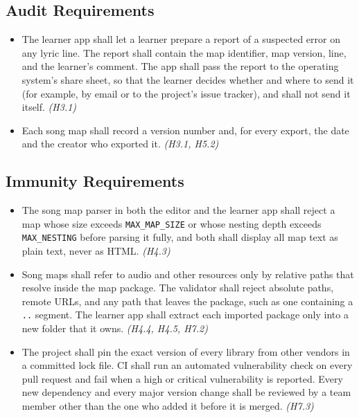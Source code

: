 \documentclass{article}
\begin{document}
\subsection{Audit Requirements}

\begin{itemize}
  \item[AU1.] The learner app shall let a learner prepare a report of a
        suspected error on any lyric line. The report shall contain the map
        identifier, map version, line, and the learner's comment. The app
        shall pass the report to the operating system's share sheet, so that
        the learner decides whether and where to send it (for example, by
        email or to the project's issue tracker), and shall not send it
        itself. \emph{(H3.1)}
  \item[AU2.] Each song map shall record a version number and, for every
        export, the date and the creator who exported it. \emph{(H3.1, H5.2)}
\end{itemize}

\subsection{Immunity Requirements}

\begin{itemize}
  \item[IM1.] The song map parser in both the editor and the learner app shall
        reject a map whose size exceeds \texttt{MAX\_MAP\_SIZE} or whose
        nesting depth exceeds \texttt{MAX\_NESTING} before parsing it fully,
        and both shall display all map text as plain text, never as HTML.
        \emph{(H4.3)}
  \item[IM2.] Song maps shall refer to audio and other resources only by
        relative paths that resolve inside the map package. The validator
        shall reject absolute paths, remote URLs, and any path that leaves the
        package, such as one containing a \texttt{..} segment. The learner app
        shall extract each imported package only into a new folder that it
        owns. \emph{(H4.4, H4.5, H7.2)}
  \item[IM3.] The project shall pin the exact version of every library from
        other vendors in a committed lock file. CI shall run an automated
        vulnerability check on every pull request and fail when a high or
        critical vulnerability is reported. Every new dependency and every
        major version change shall be reviewed by a team member other than
        the one who added it before it is merged. \emph{(H7.3)}
\end{itemize}
\end{document}
